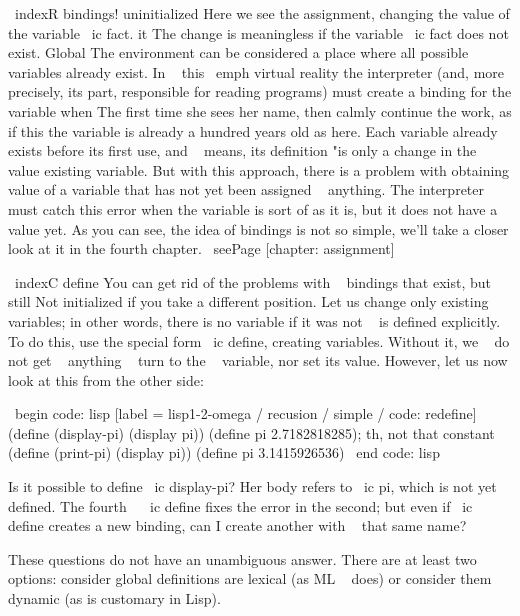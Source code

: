 \ indexR {bindings! uninitialized}
Here we see the assignment, changing the value of the variable \ ic {fact}. it
The change is meaningless if the variable \ ic {fact} does not exist. Global
The environment can be considered a place where all possible variables already exist.
In ~ this \ emph {virtual reality} the interpreter (and, more precisely, its part,
responsible for reading programs) must create a binding for the variable when
The first time she sees her name, then calmly continue the work, as if this
the variable is already a hundred years old as here. Each variable already exists before its
first use, and ~ means, its definition "is only a change in the value
existing variable. But with this approach, there is a problem with obtaining
value of a variable that has not yet been assigned ~ anything. The interpreter must
catch this error when the variable is sort of as it is, but it does not have a value yet.
As you can see, the idea of ​​bindings is not so simple, we'll take a closer look at it
in the fourth chapter. \ seePage [chapter: assignment]

\ indexC {define}
You can get rid of the problems with ~ bindings that exist, but still
Not initialized if you take a different position. Let us change only
existing variables; in other words, there is no variable if it was not ~
is defined explicitly. To do this, use the special form \ ic {define},
creating variables. Without it, we ~ do not get ~ anything ~ turn to the ~ variable,
nor set its value. However, let us now look at this from the other side:

\ begin {code: lisp} [label = lisp1-2-omega / recusion / simple / code: redefine]
(define (display-pi)
  (display pi))
(define pi 2.7182818285); th, not that constant
(define (print-pi)
  (display pi))
(define pi 3.1415926536)
\ end {code: lisp}

Is it possible to define \ ic {display-pi}? Her body refers to \ ic {pi},
which is not yet defined. The fourth ~ \ ic {define} fixes the error in the second; but
even if \ ic {define} creates a new binding, can I create another
with ~ that same name?

These questions do not have an unambiguous answer. There are at least two options: consider
global definitions are lexical (as ML ~ does) or consider them
dynamic (as is customary in Lisp).

